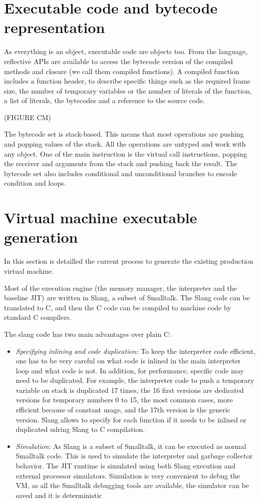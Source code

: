 \documentclass[a4paper,12pt,twoside]{../includes/ThesisStyle}
\begin{document}
\section{Executable code and bytecode representation}

As everything is an object, executable code are objects too. From the language, reflective APIs are available to access the bytecode version of the compiled methods and closure (we call them compiled functions). A compiled function includes a function header, to describe specific things such as the required frame size, the number of temporary variables or the number of literals of the function, a list of literals, the bytecodes and a reference to the source code. 

(FIGURE CM)

The bytecode set is stack-based. This means that most operations are pushing and popping values of the stack. All the operations are untyped and work with any object. One of the main instruction is the virtual call instructions, popping the receiver and arguments from the stack and pushing back the result. The bytecode set also includes conditional and unconditional branches to encode condition and loops.

\section{Virtual machine executable generation}


\cite{Inga97a}

In this section is detailled the current process to generate the existing production virtual machine. 

Most of the execution engine (the memory manager, the interpreter and the baseline JIT) are written in Slang, a subset of Smalltalk. The Slang code can be translated to C, and then the C code can be compiled to machine code by standard C compilers.

The slang code has two main advantages over plain C:
\begin{itemize}
	\item \emph{Specifying inlining and code duplication:} To keep the interpreter code efficient, one has to be very careful on what code is inlined in the main interpreter loop and what code is not. In addition, for performance, specific code may need to be duplicated. For example, the interpreter code to push a temporary variable on stack is duplicated 17 times, the 16 first versions are dedicated versions for temporary numbers 0 to 15, the most common cases, more efficient because of constant usage, and the 17th version is the generic version. Slang allows to specify for each function if it needs to be inlined or duplicated udring Slang to C compilation.
	\item \emph{Simulation:} As Slang is a subset of Smalltalk, it can be executed as normal Smalltalk code. This is used to simulate the interpreter and garbage collector behavior. The JIT runtime is simulated using both Slang execution and external processor simulators. Simulation is very convenient to debug the VM, as all the Smalltalk debugging tools are available, the simulator can be saved and it is deterministic
\end{itemize}
\end{document}
